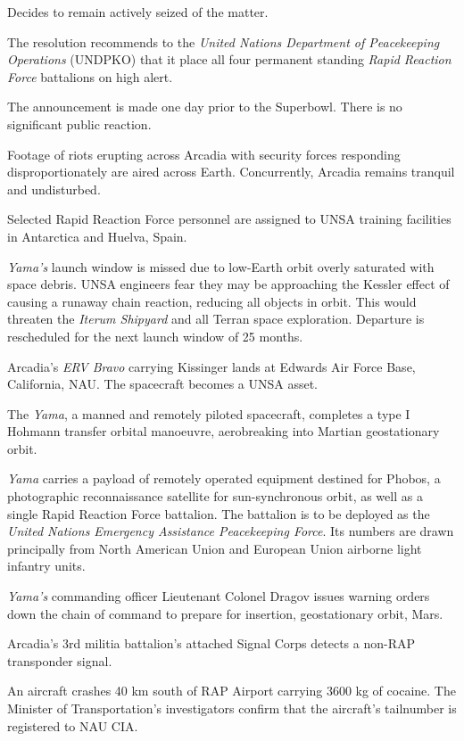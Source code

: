 \item Decides to remain actively seized of the matter.
\stopitemize
\StopTimelineDocument

The resolution recommends to the {\it United Nations Department of Peacekeeping Operations} (UNDPKO) that it place all four permanent standing {\it Rapid Reaction Force} battalions on high alert.

The announcement is made one day prior to the Superbowl. There is no significant public reaction.
\StopTimelineDate

Footage of riots erupting across Arcadia with security forces responding disproportionately are aired across Earth. Concurrently, Arcadia remains tranquil and undisturbed.
\StopTimelineDate

Selected Rapid Reaction Force personnel are assigned to UNSA training facilities in Antarctica and Huelva, Spain.
\StopTimelineDate

{\it Yama's} launch window is missed due to low-Earth orbit overly saturated with space debris. UNSA engineers fear they may be approaching the Kessler effect of causing a runaway chain reaction, reducing all objects in orbit. This would threaten the {\it Iterum Shipyard} and all Terran space exploration. Departure is rescheduled for the next launch window of 25 months.
\StopTimelineDate

Arcadia's {\it ERV Bravo} carrying Kissinger lands at Edwards Air Force Base, California, NAU. The spacecraft becomes a UNSA asset.
\StopTimelineDate

The {\it Yama}, a manned and remotely piloted spacecraft, completes a type I Hohmann transfer orbital manoeuvre, aerobreaking into Martian geostationary orbit. 

{\it Yama} carries a payload of remotely operated equipment destined for Phobos, a photographic reconnaissance satellite for sun-synchronous orbit, as well as a single Rapid Reaction Force battalion. The battalion is to be deployed as the {\it United Nations Emergency Assistance Peacekeeping Force}. Its numbers are drawn principally from North American Union and European Union airborne light infantry units.
\StopTimelineDate

{\it Yama's} commanding officer Lieutenant Colonel Dragov issues warning orders down the chain of command to prepare for insertion, geostationary orbit, Mars.
\StopTimelineDate

Arcadia's 3rd militia battalion's attached Signal Corps detects a non-RAP transponder signal.
\StopTimelineDate

An aircraft crashes 40 km south of RAP Airport carrying 3600 kg of cocaine. The Minister of Transportation's investigators confirm that the aircraft's tailnumber is registered to NAU CIA.
\StopTimelineDate

\stoplines

\StopChapter

